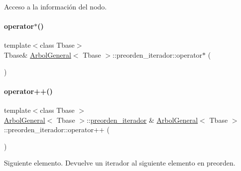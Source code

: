 Acceso a la información del nodo. 

\hypertarget{classArbolGeneral_1_1preorden__iterador_a2336e1008cac3a859337da8fc24075d0}{}\label{classArbolGeneral_1_1preorden__iterador_a2336e1008cac3a859337da8fc24075d0} 
\paragraph{\texorpdfstring{operator$\ast$()}{operator*()}\hspace{0.1cm}{\footnotesize\ttfamily [2/2]}}
{\footnotesize\ttfamily template$<$class Tbase$>$ \\
Tbase\& \hyperlink{classArbolGeneral}{Arbol\+General}$<$ Tbase $>$\+::preorden\+\_\+iterador\+::operator$\ast$ (\begin{DoxyParamCaption}{ }\end{DoxyParamCaption})\hspace{0.3cm}{\ttfamily [inline]}}

\hypertarget{classArbolGeneral_1_1preorden__iterador_a6ce61fb0ab8c1b0aa3bd91266618eeb5}{}\label{classArbolGeneral_1_1preorden__iterador_a6ce61fb0ab8c1b0aa3bd91266618eeb5} 
\paragraph{\texorpdfstring{operator++()}{operator++()}}
{\footnotesize\ttfamily template$<$class Tbase $>$ \\
\hyperlink{classArbolGeneral}{Arbol\+General}$<$ Tbase $>$\+::\hyperlink{classArbolGeneral_1_1preorden__iterador}{preorden\+\_\+iterador} \& \hyperlink{classArbolGeneral}{Arbol\+General}$<$ Tbase $>$\+::preorden\+\_\+iterador\+::operator++ (\begin{DoxyParamCaption}{ }\end{DoxyParamCaption})}



Siguiente elemento.  Devuelve un iterador al siguiente elemento en preorden. 

\hypertarget{classArbolGeneral_1_1preorden__iterador_a79952609e35dd16830356a19b404abba}{}\label{classArbolGeneral_1_1preorden__iterador_a79952609e35dd16830356a19b404abba} 
